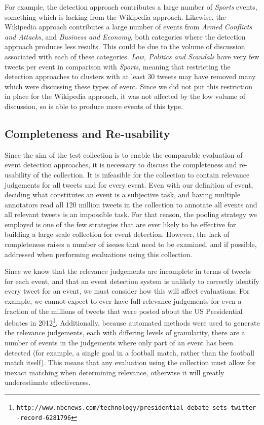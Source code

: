 For example, the detection approach contributes a large number of \emph{Sports} events, something which is lacking from the Wikipedia approach.
Likewise, the Wikipedia approach contributes a large number of events from \emph{Armed Conflicts and Attacks}, and \emph{Business and Economy}, both categories where the detection approach produces less results.
This could be due to the volume of discussion associated with each of these categories.
\emph{Law, Politics and Scandals} have very few tweets per event in comparison with \emph{Sports}, meaning that restricting the detection approaches to clusters with at least 30 tweets may have removed many which were discussing these types of event.
Since we did not put this restriction in place for the Wikipedia approach, it was not affected by the low volume of discussion, so is able to produce more events of this type.

\subsection{Completeness and Re-usability}
Since the aim of the test collection is to enable the comparable evaluation of event detection approaches, it is necessary to discuss the completeness and re-usability of the collection.
It is infeasible for the collection to contain relevance judgements for all tweets and for every event.
Even with our definition of event, deciding what constitutes an event is a subjective task, and having multiple annotators read all 120 million tweets in the collection to annotate all events and all relevant tweets is an impossible task.
For that reason, the pooling strategy we employed is one of the few strategies that are ever likely to be effective for building a large scale collection for event detection.
However, the lack of completeness raises a number of issues that need to be examined, and if possible, addressed when performing evaluations using this collection.

Since we know that the relevance judgements are incomplete in terms of tweets for each event, and that an event detection system is unlikely to correctly identify every tweet for an event, we must consider how this will affect evaluations.
For example, we cannot expect to ever have full relevance judgements for even a fraction of the millions of tweets that were posted about the US Presidential debates in 2012\footnote{\texttt{http://www.nbcnews.com/technology/presidential-debate-sets-twitter\\-record-6281796}}.
Additionally, because automated methods were used to generate the relevance judgements, each with differing levels of granularity, there are a number of events in the judgements where only part of an event has been detected (for example, a single goal in a football match, rather than the football match itself).
This means that any evaluation using the collection must allow for inexact matching when determining relevance, otherwise it will greatly underestimate effectiveness.

